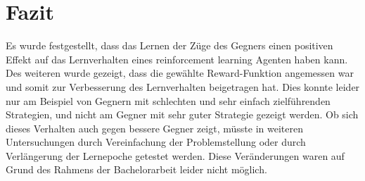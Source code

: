 \chapter{Fazit}%

\label{cha:Fazit}
Es wurde festgestellt, dass das Lernen der Züge des Gegners einen positiven Effekt auf das Lernverhalten eines reinforcement learning Agenten haben kann. 
Des weiteren wurde gezeigt, dass die  gewählte Reward-Funktion angemessen war und somit zur Verbesserung des Lernverhalten beigetragen hat.
Dies konnte leider nur am Beispiel von Gegnern mit schlechten und sehr einfach zielführenden Strategien, und nicht am Gegner mit sehr guter Strategie gezeigt werden.
Ob sich dieses Verhalten auch gegen bessere Gegner zeigt, müsste in weiteren Untersuchungen durch Vereinfachung der Problemstellung oder durch Verlängerung der Lernepoche getestet werden.
Diese Veränderungen waren auf Grund des Rahmens der Bachelorarbeit leider nicht möglich.


